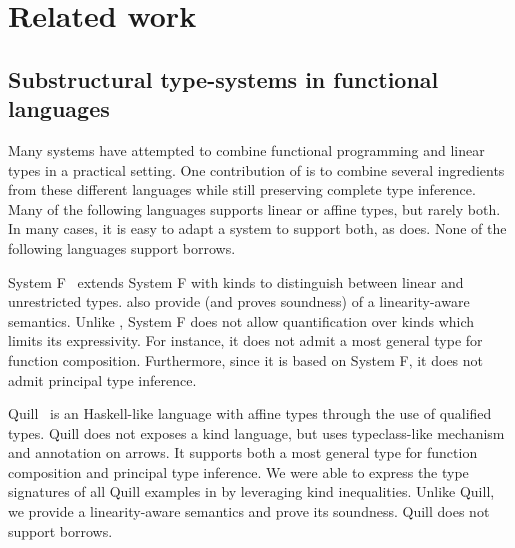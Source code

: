 \section{Related work}
\label{sec:related-work}





\subsection{Substructural type-systems in functional languages}

Many systems have attempted to combine
functional programming and linear types in a practical setting.
One contribution of \lang is to combine several ingredients
from these different languages while still preserving
complete type inference.
Many of the following languages supports linear or affine types, but rarely
both. In many cases, it is easy to adapt a system to support both, as
\lang does.
None of the following languages support borrows.

System F\degree~\citep{DBLP:conf/tldi/MazurakZZ10}
extends System F with kinds to distinguish
between linear and unrestricted types.
\citet{DBLP:conf/tldi/MazurakZZ10} also provide
(and proves soundness) of a linearity-aware semantics.
Unlike \lang, System F\degree{} does not allow
quantification over kinds which limits its expressivity. For instance, it
does not admit a most general type for function composition.
Furthermore, since it is based on System F, it does not admit
principal type inference.

Quill~\citep{DBLP:conf/icfp/Morris16} is an Haskell-like language with affine
types through the use of qualified types.
Quill does not exposes a kind language, but
uses typeclass-like mechanism and annotation on arrows.
It supports both a most general type for function composition and
principal type inference.
We were able to express the type signatures of all Quill examples
in \lang by leveraging kind inequalities.
Unlike Quill,
we provide a linearity-aware semantics and prove its soundness.
Quill does not support borrows.


